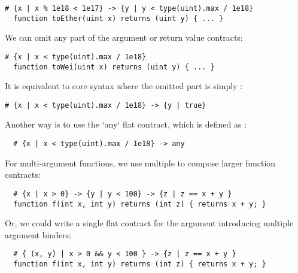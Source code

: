 \begin{lstlisting}[language=Solidity]
  # {x | x % 1e18 < 1e17} -> {y | y < type(uint).max / 1e18}
  function toEther(uint x) returns (uint y) { ... }
\end{lstlisting}

We can omit any part of the argument or return value contracts:


\begin{lstlisting}[language=Solidity]
  # {x | x < type(uint).max / 1e18}
  function toWei(uint x) returns (uint y) { ... }
\end{lstlisting}

It is equivalent to core syntax where the omitted part is simply :

\begin{lstlisting}[language=Solidity]
  # {x | x < type(uint).max / 1e18} -> {y | true}
\end{lstlisting}

Another way is to use the `any` flat contract, which is defined as
:
\begin{lstlisting}
  # {x | x < type(uint).max / 1e18} -> any
\end{lstlisting}

For multi-argument functions, we use multiple \code{->} to compose larger function
contracts:

\begin{lstlisting}
  # {x | x > 0} -> {y | y < 100} -> {z | z == x + y }
  function f(int x, int y) returns (int z) { returns x + y; }
\end{lstlisting}


Or, we could write a single flat contract for the argument introducing
multiple argument binders:

\begin{lstlisting}
  # { (x, y) | x > 0 && y < 100 } -> {z | z == x + y }
  function f(int x, int y) returns (int z) { returns x + y; }
\end{lstlisting}

